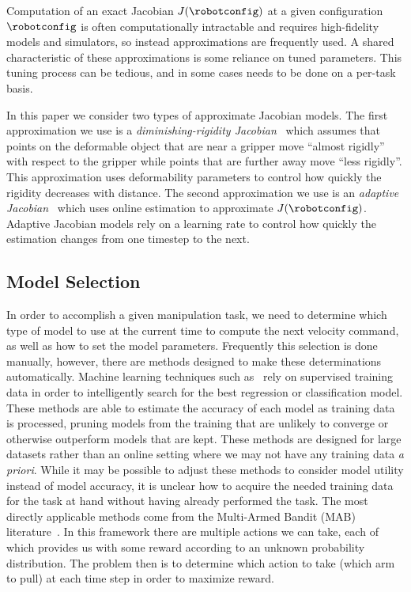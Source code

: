 Computation of an exact Jacobian $J(\robotconfig)$ at a given configuration $\robotconfig$ is often computationally intractable and requires high-fidelity models and simulators, so instead approximations are frequently used. A shared characteristic of these approximations is some reliance on tuned parameters. This tuning process can be tedious, and in some cases needs to be done on a per-task basis.

In this paper we consider two types of approximate Jacobian models. The first approximation we use is a \textit{diminishing-rigidity Jacobian}~\cite{Berenson2013} which assumes that points on the deformable object that are near a gripper move ``almost rigidly'' with respect to the gripper while points that are further away move ``less rigidly''. This approximation uses deformability parameters to control how quickly the rigidity decreases with distance. The second approximation we use is an \textit{adaptive Jacobian}~\cite{Navarro-Alarcon2013} which uses online estimation to approximate $J(\robotconfig)$. Adaptive Jacobian models rely on a learning rate to control how quickly the estimation changes from one timestep to the next.

\subsection{Model Selection}

In order to accomplish a given manipulation task, we need to determine which type of model to use at the current time to compute the next velocity command, as well as how to set the model parameters. Frequently this selection is done manually, however, there are methods designed to make these determinations automatically. Machine learning techniques such as~\cite{Maron1994,Sparks2015} rely on supervised training data in order to intelligently search for the best regression or classification model. These methods are able to estimate the accuracy of each model as training data is processed, pruning models from the training that are unlikely to converge or otherwise outperform models that are kept. These methods are designed for large datasets rather than an online setting where we may not have any training data \textit{a priori}. While it may be possible to adjust these methods to consider model utility instead of model accuracy, it is unclear how to acquire the needed training data for the task at hand without having already performed the task. The most directly applicable methods come from the Multi-Armed Bandit (MAB) literature~\cite{Auer2002,Gittins2011,Whittle1988}. In this framework there are multiple actions we can take, each of which provides us with some reward according to an unknown probability distribution. The problem then is to determine which action to take (which arm to pull) at each time step in order to maximize reward.

